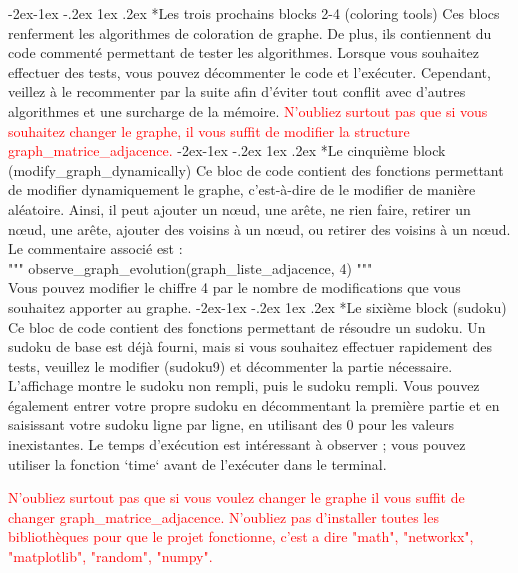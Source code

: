 \documentclass{report}
\makeatletter
\renewcommand\subsection{\@startsection{subsection}{2}{\z@}%
  {-2ex\@plus -1ex \@minus -.2ex}%
  {1ex \@plus .2ex}%
  {\normalfont\bfseries}}
\makeatother
\begin{document}
\subsection*{Les trois prochains blocks 2-4  (coloring tools) }
\hspace{2em}Ces blocs renferment les algorithmes de coloration de graphe. De plus, ils contiennent du code commenté permettant de tester les algorithmes. Lorsque vous souhaitez effectuer des tests, vous pouvez décommenter le code et l'exécuter. Cependant, veillez à le recommenter par la suite afin d'éviter tout conflit avec d'autres algorithmes et une surcharge de la mémoire.
\textcolor{red}{N'oubliez surtout pas que si vous souhaitez changer le graphe, il vous suffit de modifier la structure graph\_matrice\_adjacence.}
\subsection*{Le cinquième block (modify\_graph\_dynamically) }
\hspace{2em} Ce bloc de code contient des fonctions permettant de modifier dynamiquement le graphe, c'est-à-dire de le modifier de manière aléatoire. Ainsi, il peut ajouter un nœud, une arête, ne rien faire, retirer un nœud, une arête, ajouter des voisins à un nœud, ou retirer des voisins à un nœud.
\\Le commentaire associé est :\\ \hspace{2em}"""
observe\_graph\_evolution(graph\_liste\_adjacence, 4)
""" \\Vous pouvez modifier le chiffre 4 par le nombre de modifications que vous souhaitez apporter au graphe.
\subsection*{Le sixième block (sudoku) }
\hspace{2em}Ce bloc de code contient des fonctions permettant de résoudre un sudoku. Un sudoku de base est déjà fourni, mais si vous souhaitez effectuer rapidement des tests, veuillez le modifier (sudoku9) et décommenter la partie nécessaire. L'affichage montre le sudoku non rempli, puis le sudoku rempli.
Vous pouvez également entrer votre propre sudoku en décommentant la première partie et en saisissant votre sudoku ligne par ligne, en utilisant des 0 pour les valeurs inexistantes. Le temps d'exécution est intéressant à observer ; vous pouvez utiliser la fonction `time` avant de l'exécuter dans le terminal.
\begin{note}
    \textcolor{red}{N'oubliez surtout pas que si vous voulez changer le graphe il vous suffit de changer graph\_matrice\_adjacence.}
    \textcolor{red}{N'oubliez pas d'installer toutes les bibliothèques pour que le projet fonctionne, c'est a dire "math", "networkx", "matplotlib", "random", "numpy".}
\end{note}
\newpage
\end{document}
